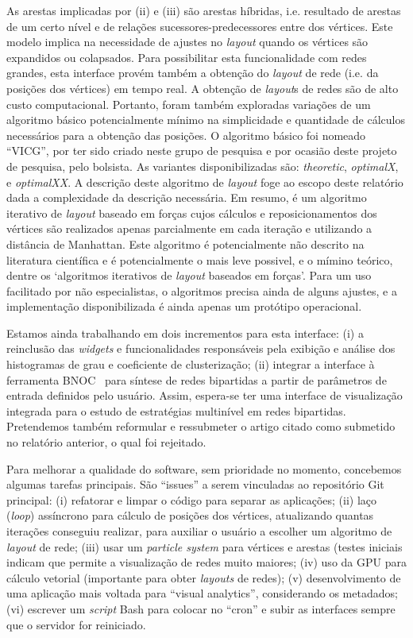 \documentclass[a4paper, 11pt]{article}
\begin{document}
As arestas implicadas por (ii) e (iii) são arestas híbridas, i.e. resultado de arestas
de um certo nível e de relações sucessores-predecessores entre dos vértices.
Este modelo implica na necessidade de ajustes no \emph{layout} quando
os vértices são expandidos ou colapsados.
Para possibilitar esta funcionalidade com redes grandes,
esta interface provém também a obtenção do \emph{layout} de rede (i.e. da posições dos vértices)
em tempo real.
A obtenção de \emph{layout}s de redes são de alto custo computacional.
Portanto, foram também exploradas variações de um algoritmo básico potencialmente
mínimo na simplicidade e quantidade de cálculos necessários para a obtenção das posições.
O algoritmo básico foi nomeado ``VICG'', por ter sido criado neste grupo de pesquisa
e por ocasião deste projeto de pesquisa, pelo bolsista.
As variantes disponibilizadas são: \emph{theoretic}, \emph{optimalX}, e \emph{optimalXX}.
A descrição deste algoritmo de \emph{layout} foge ao escopo deste relatório dada a complexidade da descrição necessária.
Em resumo, é um algoritmo iterativo de \emph{layout} baseado em forças cujos cálculos e reposicionamentos dos vértices
são realizados apenas parcialmente em cada iteração e utilizando a distância de Manhattan.
Este algoritmo é potencialmente não descrito na literatura científica e é potencialmente o mais leve possivel,
e o mímino teórico, dentre os `algoritmos iterativos de \emph{layout} baseados em forças'.
Para um uso facilitado por não especialistas, o algoritmos precisa ainda de alguns ajustes,
e a implementação disponibilizada é ainda apenas um protótipo operacional.

Estamos ainda trabalhando em dois incrementos para esta interface: (i)
a reinclusão das \emph{widgets} e funcionalidades responsáveis pela exibição e análise dos histogramas de grau e 
coeficiente de clusterização; (ii) integrar a interface à ferramenta BNOC~\cite{bnoc} para síntese 
de redes bipartidas a partir de parâmetros de entrada definidos pelo usuário.
Assim, espera-se ter uma interface de visualização integrada para o estudo de estratégias
multinível em redes bipartidas. 
Pretendemos também reformular e ressubmeter o artigo citado como submetido no relatório anterior, o qual foi rejeitado.

Para melhorar a qualidade do software, sem prioridade no momento,
concebemos algumas tarefas principais.
São ``issues'' a serem vinculadas ao repositório Git principal:
(i) refatorar e limpar o código para separar as aplicações;
(ii) laço (\emph{loop}) assíncrono para cálculo de posições dos vértices,
atualizando quantas iterações conseguiu realizar,
para auxiliar o usuário a escolher um algoritmo de \emph{layout} de rede;
(iii) usar um \emph{particle system} para vértices e arestas
(testes iniciais indicam que permite a visualização de redes muito maiores;
(iv) uso da GPU para cálculo vetorial (importante para obter \emph{layouts} de redes);
(v) desenvolvimento de uma aplicação mais voltada para ``visual analytics'', considerando os metadados;
(vi) escrever um \emph{script} Bash para colocar no ``cron'' e subir as interfaces sempre que o servidor for reiniciado.
\end{document}

